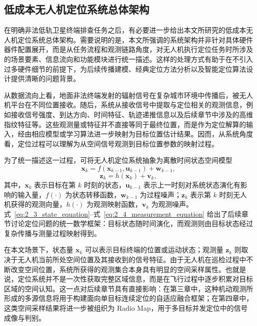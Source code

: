 \subsection{低成本无人机定位系统总体架构}
\label{subsec:2_1_2}

在明确非法低轨卫星终端排查任务之后，有必要进一步给出本文所研究的低成本无人机定位系统总体架构。需要说明的是，本文所强调的系统架构并非针对具体硬件器件配置展开，而是从任务流程和观测链路角度，对无人机执行定位任务时所涉及的场景要素、信息流向和功能模块进行统一描述。这样的处理方式有助于在不引入过多硬件细节的前提下，为后续传播建模、经典定位方法分析以及智能定位算法设计提供清晰的问题背景。


从数据流向上看，地面非法终端发射的辐射信号在复杂城市环境中传播后，被无人机平台在不同位置接收。随后，系统从接收信号中提取与定位相关的观测信息，例如接收信号强度、到达方向、时间特征、轨迹递推信息以及后续章节中涉及的高维指纹特征等。这些观测量或特征并不直接等同于最终位置，而是作为定位解算的输入，经由相应模型或学习算法进一步映射为目标位置估计结果。因而，从系统角度看，定位过程可以理解为从空间信号观测到目标位置参数的映射过程。

为了统一描述这一过程，可将无人机定位系统抽象为离散时间状态空间模型
\begin{equation}
\mathbf{x}_{k}
=
f(\mathbf{x}_{k-1},\mathbf{u}_{k-1})+\mathbf{w}_{k-1},
\label{eq:2_3_state_equation}
\end{equation}
\begin{equation}
\mathbf{z}_{k}
=
h(\mathbf{x}_{k})+\mathbf{v}_{k},
\label{eq:2_4_measurement_equation}
\end{equation}
其中，$\mathbf{x}_k$ 表示目标在第 $k$ 时刻的状态，$\mathbf{u}_{k-1}$ 表示上一时刻对系统状态演化有影响的输入量，$f(\cdot)$ 为状态转移函数，$\mathbf{w}_{k-1}$ 为过程噪声；$\mathbf{z}_k$ 表示第 $k$ 时刻无人机获得的观测向量，$h(\cdot)$ 为观测映射函数，$\mathbf{v}_k$ 为观测噪声。式~\eqref{eq:2_3_state_equation}--式~\eqref{eq:2_4_measurement_equation} 给出了后续章节讨论定位问题的统一数学框架：目标状态随时间演化，而观测则由目标状态经过复杂传播与测量过程映射得到。

在本文场景下，状态量 $\mathbf{x}_k$ 可以表示目标终端的位置或运动状态；观测量 $\mathbf{z}_k$ 则取决于无人机当前所处空间位置及其接收到的信号特征。由于无人机在巡检过程中不断改变空间位置，系统所获得的观测集合本身具有明显的空间采样属性。也就是说，定位系统并不是一次性获取完整区域信息，而是在飞行过程中逐步积累对目标区域的空间认知。这一点对后续章节具有直接影响：在第三章中，这种机动观测所形成的多源信息将用于构建面向单目标连续定位的自适应融合框架；在第四章中，这类空间采样结果将进一步被组织为 Radio Map，用于多目标并发定位中的信号成像与判别。

